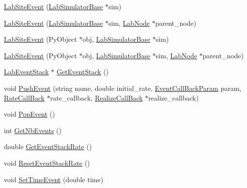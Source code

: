 \begin{DoxyCompactItemize}
\item 
\hyperlink{classelps_1_1_lab_site_event_a117c348191564b3f6a684482230f8a17}{Lab\+Site\+Event} (\hyperlink{classelps_1_1_lab_simulator_base}{Lab\+Simulator\+Base} $\ast$sim)
\item 
\hyperlink{classelps_1_1_lab_site_event_a19847eaac898edc47a392fa4af05396d}{Lab\+Site\+Event} (\hyperlink{classelps_1_1_lab_simulator_base}{Lab\+Simulator\+Base} $\ast$sim, \hyperlink{classelps_1_1_lab_node}{Lab\+Node} $\ast$parent\+\_\+node)
\item 
\hyperlink{classelps_1_1_lab_site_event_a7ead3e9663c0b9103c11e822f2b5e51e}{Lab\+Site\+Event} (Py\+Object $\ast$obj, \hyperlink{classelps_1_1_lab_simulator_base}{Lab\+Simulator\+Base} $\ast$sim)
\item 
\hyperlink{classelps_1_1_lab_site_event_a53b0a935dc4185d9aa3d3a6325530923}{Lab\+Site\+Event} (Py\+Object $\ast$obj, \hyperlink{classelps_1_1_lab_simulator_base}{Lab\+Simulator\+Base} $\ast$sim, \hyperlink{classelps_1_1_lab_node}{Lab\+Node} $\ast$parent\+\_\+node)
\item 
\hyperlink{classelps_1_1_lab_event_stack}{Lab\+Event\+Stack} $\ast$ \hyperlink{classelps_1_1_lab_site_event_a1e763ec961a24837734f5c54e0f561b6}{Get\+Event\+Stack} ()
\item 
void \hyperlink{classelps_1_1_lab_site_event_a20f650621d12bd6bf9510bcf6d212fec}{Push\+Event} (string name, double initial\+\_\+rate, \hyperlink{namespaceelps_a1bd4230d698fa66dd38f0fc1cc5c2c55}{Event\+Call\+Back\+Param} param, \hyperlink{namespaceelps_a121bfb217e5fbb734b95d3f7b6653fb2}{Rate\+Call\+Back} $\ast$rate\+\_\+callback, \hyperlink{namespaceelps_adb49d5dbf827d9b190d0b1fd15e0193c}{Realize\+Call\+Back} $\ast$realize\+\_\+callback)
\item 
void \hyperlink{classelps_1_1_lab_site_event_a8416ab18d555c7f46e4600f908aab92c}{Pop\+Event} ()
\item 
int \hyperlink{classelps_1_1_lab_site_event_a12fd4e99e01db05d8da743ac3fa27ee4}{Get\+Nb\+Events} ()
\item 
double \hyperlink{classelps_1_1_lab_site_event_afe1ddd9f7100ab36adaef5f6c4a24942}{Get\+Event\+Stack\+Rate} ()
\item 
void \hyperlink{classelps_1_1_lab_site_event_ac1bc0340ca07f66b92beb8f31c7f0afe}{Reset\+Event\+Stack\+Rate} ()
\item 
void \hyperlink{classelps_1_1_lab_site_event_a97b1ba428e217f2ae56e21e6cd508ebb}{Set\+Time\+Event} (double time)
\item 

\end{DoxyCompactItemize}
